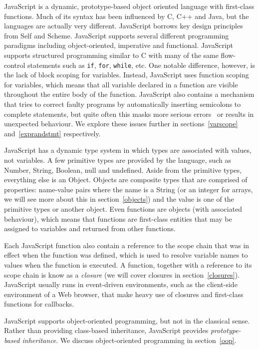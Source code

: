 JavaScript is a dynamic, prototype-based object oriented language with first-class
functions. Much of its syntax has been influenced by C, C++ and Java, but
the languages are actually very different. JavaScript borrows key design principles
from Self and Scheme. JavaScript supports several different programming
paradigms including object-oriented, imperative and functional. JavaScript supports
structured programming similar to C with many of the same flow-control statements
such as \texttt{if}, \texttt{for}, \texttt{while}, etc. One notable difference,
however, is the lack of block scoping for variables. Instead, JavaScript 
uses function scoping
for variables, which means that all variable declared in a function are
visible throughout the entire body of the function. 
JavaScript also contains a mechanism that tries to
correct faulty programs by automatically inserting semicolons to complete statements, but quite
often this masks more serious errors~\cite{goodparts} or results in unexpected behaviour.
We explore these issues further in sections~\ref{varscope} and~\ref{exprandstmt} respectively.

JavaScript has a dynamic type system in which types are associated with values,
not variables. A few primitive types are provided by the language, such
as Number, String, Boolean, null and undefined. Aside from the primitive types,
everything else is an Object. Objects are composite types
that are comprised of properties: name-value pairs where the name is a String
(or an integer for arrays, we will see more about this in section~\ref{objects})
and the value is one of the primitive types or another object. Even functions
are objects (with associated behaviour), which means that functions are first-class
entities that may be assigned to variables and returned from other functions.

Each JavaScript function also contain a reference to the scope chain that was
in effect when the function was defined, which is used to resolve variable
names to values when the function is executed. A function, together with a
reference to its scope chain is know as a \emph{closure} (we will cover closures
in section~\ref{closures}). 
JavaScript usually runs in event-driven environments, such as the client-side
environment of a Web browser, that make heavy use of closures and first-class 
functions for callbacks.

JavaScript supports object-oriented programming, but not in the classical
sense. Rather than providing class-based inheritance, JavaScript provides
\emph{prototype-based inheritance}. We discuss object-oriented programming
in section~\ref{oop}.

